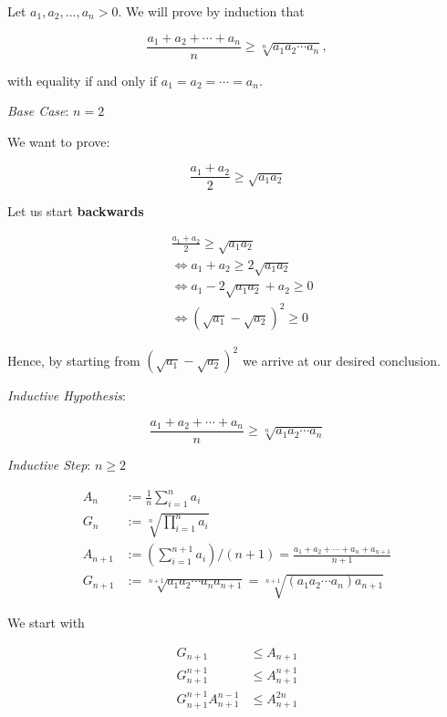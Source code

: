 Let \( a_1, a_2, \dots, a_n > 0 \). We will prove by induction that

\[
	\frac{a_1 + a_2 + \cdots + a_n}{n} \geq \sqrt[n]{a_1 a_2 \cdots a_n},
\]

with equality if and only if \( a_1 = a_2 = \cdots = a_n \).

\emph{Base Case}: \( n = 2 \)

We want to prove:

\[
	\frac{a_1 + a_2}{2} \geq \sqrt{a_1 a_2}
\]

Let us start \textbf{backwards}

\begin{align*}
	 & \frac{a_1 + a_2}{2} \geq \sqrt{a_1 a_2}  \\
	 & \iff  a_1 + a_2 \geq 2\sqrt{a_1 a_2}     \\
	 & \iff a_1 - 2\sqrt{a_1 a_2 } + a_2 \geq 0 \\
	 & \iff (\sqrt{a_1} - \sqrt{a_2})^2 \geq 0
\end{align*}

Hence, by starting from \((\sqrt{a_1} - \sqrt{a_2})^2\) we arrive at our desired conclusion.

\emph{Inductive Hypothesis}:

\[
	\frac{a_1 + a_2 + \cdots + a_n}{n} \geq \sqrt[n]{a_1 a_2 \cdots a_n}
\]

\emph{Inductive Step}: \( n \geq 2 \)

\begin{align*}
	A_{n}     & := \frac{1}{n}\sum_{i = 1}^{n} a_i                                                                    \\
	G_{n}     & := \sqrt[n]{\prod_{i = 1}^{n} a_i}                                                                    \\
	A_{n + 1} & := \left(\sum_{i=1}^{n + 1} a_i\right) / (n + 1) = \frac{a_1 + a_2 + \cdots + a_n + a_{n + 1}}{n + 1} \\
	G_{n + 1} & := \sqrt[n + 1]{a_1 a_2 \cdots a_n a_{n + 1}} = \sqrt[n + 1]{(a_1 a_2 \cdots a_n) a_{n + 1}}
\end{align*}

We start with

\begin{align*}
	G_{n + 1}                           & \le A_{n + 1}         \\
	G_{n + 1}^{n + 1}                   & \le A_{n + 1}^{n + 1} \\
	G_{n + 1}^{n + 1} A_{n + 1}^{n - 1} & \le A_{n + 1}^{2n}    \\
\end{align*}

